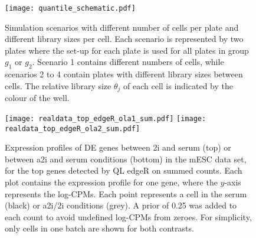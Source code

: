 \documentclass{article}
\begin{document}


\begin{figure}[p]
    \begin{center}
        \texttt{[image: quantile\_schematic.pdf]}
    \end{center}
    \caption{
        Simulation scenarios with different number of cells per plate and different library sizes per cell.
        Each scenario is represented by two plates where the set-up for each plate is used for all plates in group $g_1$ or $g_2$.
        Scenario 1 contains different numbers of cells, while scenarios 2 to 4 contain plates with different library sizes between cells.
        The relative library size $\theta_j$ of each cell is indicated by the colour of the well.
    }
    \label{fig:compsim}
\end{figure}

\begin{figure}[p]
    \begin{center}
        \texttt{[image: realdata\_top\_edgeR\_ola1\_sum.pdf]}
        \texttt{[image: realdata\_top\_edgeR\_ola2\_sum.pdf]}
    \end{center}
\caption{
    Expression profiles of DE genes between 2i and serum (top) or between a2i and serum conditions (bottom) in the mESC data set, 
        for the top genes detected by QL edgeR on summed counts.
    Each plot contains the expression profile for one gene, where the $y$-axis represents the log-CPMs.
    Each point represents a cell in the serum (black) or a2i/2i conditions (grey).
    A prior of 0.25 was added to each count to avoid undefined log-CPMs from zeroes.
    For simplicity, only cells in one batch are shown for both contrasts.
}
\label{fig:realdata}
\end{figure}



 
\end{document}
